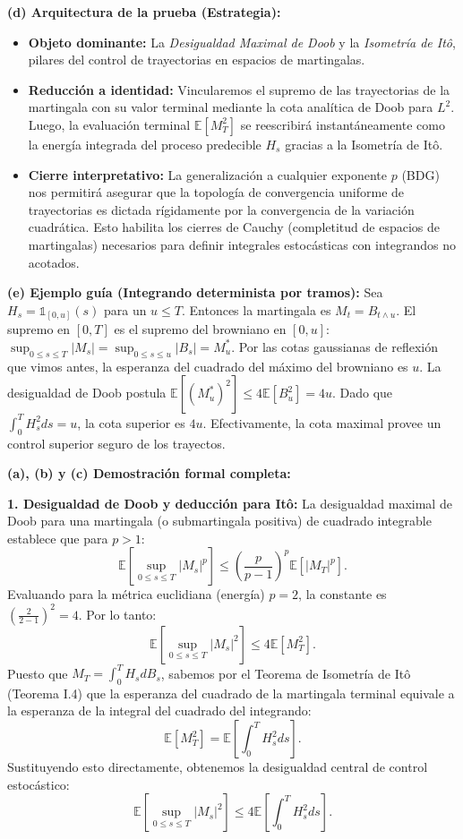 \documentclass[11pt, letterpaper]{article}
\begin{document}
\begin{solucion}
    \textbf{(d) Arquitectura de la prueba (Estrategia):}
    \begin{itemize}
        \item[(i)] \textbf{Objeto dominante:} La \textit{Desigualdad Maximal de Doob} y la \textit{Isometría de Itô}, pilares del control de trayectorias en espacios de martingalas.
        \item[(ii)] \textbf{Reducción a identidad:} Vincularemos el supremo de las trayectorias de la martingala con su valor terminal mediante la cota analítica de Doob para $L^2$. Luego, la evaluación terminal $\mathbb{E}[M_T^2]$ se reescribirá instantáneamente como la energía integrada del proceso predecible $H_s$ gracias a la Isometría de Itô.
        \item[(iii)] \textbf{Cierre interpretativo:} La generalización a cualquier exponente $p$ (BDG) nos permitirá asegurar que la topología de convergencia uniforme de trayectorias es dictada rígidamente por la convergencia de la variación cuadrática. Esto habilita los cierres de Cauchy (completitud de espacios de martingalas) necesarios para definir integrales estocásticas con integrandos no acotados.
    \end{itemize}

    \vspace{3mm}
    \textbf{(e) Ejemplo guía (Integrando determinista por tramos):}
    Sea $H_s = \mathbb{1}_{[0, u]}(s)$ para un $u \le T$. Entonces la martingala es $M_t = B_{t \wedge u}$.
    El supremo en $[0, T]$ es el supremo del browniano en $[0, u]$: $\sup_{0 \le s \le T} |M_s| = \sup_{0 \le s \le u} |B_s| = M_u^*$.
    Por las cotas gaussianas de reflexión que vimos antes, la esperanza del cuadrado del máximo del browniano es $u$.
    La desigualdad de Doob postula $\mathbb{E}[(M_u^*)^2] \le 4 \mathbb{E}[B_u^2] = 4u$. Dado que $\int_0^T H_s^2 ds = u$, la cota superior es $4u$. Efectivamente, la cota maximal provee un control superior seguro de los trayectos.

    \textbf{(a), (b) y (c) Demostración formal completa:}

    \textbf{1. Desigualdad de Doob y deducción para Itô:}
    La desigualdad maximal de Doob para una martingala (o submartingala positiva) de cuadrado integrable establece que para $p > 1$:
    \[ \mathbb{E}\left[\sup_{0 \le s \le T} |M_s|^p\right] \le \left(\frac{p}{p-1}\right)^p \mathbb{E}[|M_T|^p]. \]
    Evaluando para la métrica euclidiana (energía) $p=2$, la constante es $(\frac{2}{2-1})^2 = 4$.
    Por lo tanto:
    \[ \mathbb{E}\left[\sup_{0 \le s \le T} |M_s|^2\right] \le 4 \mathbb{E}[M_T^2]. \]
    Puesto que $M_T = \int_0^T H_s dB_s$, sabemos por el Teorema de Isometría de Itô (Teorema I.4) que la esperanza del cuadrado de la martingala terminal equivale a la esperanza de la integral del cuadrado del integrando:
    \[ \mathbb{E}[M_T^2] = \mathbb{E}\left[ \int_0^T H_s^2 ds \right]. \]
    Sustituyendo esto directamente, obtenemos la desigualdad central de control estocástico:
    \[ \mathbb{E}\left[\sup_{0 \le s \le T} |M_s|^2\right] \le 4 \mathbb{E}\left[\int_0^T H_s^2 ds\right]. \]


\end{solucion}
\end{document}
